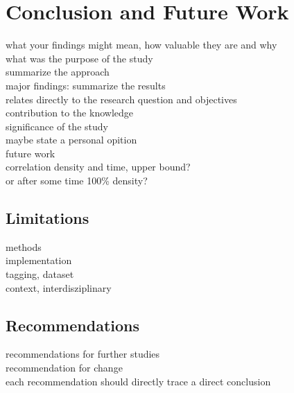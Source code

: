 \chapter{Conclusion and Future Work}
\label{ch:conclusion}

what your findings might mean, how valuable they are and why\\
what was the purpose of the study\\
summarize the approach\\
major findings: summarize the results\\


relates directly to the research question and objectives\\
contribution to the knowledge\\
significance of the study\\
maybe state a personal opition\\

future work\\
correlation density and time, upper bound?\\
or after some time 100\% density?\\

\section{Limitations}
methods\\
implementation\\
tagging, dataset\\
context, interdisziplinary\\

\section{Recommendations}
recommendations for further studies\\
recommendation for change\\
each recommendation should directly trace a direct conclusion\\